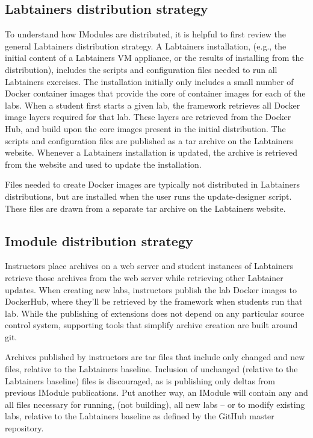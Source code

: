 \documentclass[12pt]{article}
\begin{document}
\subsection{Labtainers distribution strategy}
To understand how IModules are distributed, it is helpful to first review the general
Labtainers distribution strategy.  A Labtainers installation, (e.g., the initial content of a Labtainers VM 
appliance, or the results of installing from the distribution),  includes the scripts and configuration files 
needed to run all Labtainers exercises.  The installation initially only includes a small number of 
Docker container images that provide the core of container images for each of the labs.   
When a student first starts a given lab, the framework retrieves all Docker image layers 
required for that lab.  These layers are retrieved from the Docker Hub, and build upon the core images
present in the initial distribution.   The scripts and configuration files are 
published as a tar archive on the Labtainers website.  Whenever a Labtainers installation is updated, 
the archive is retrieved from the website and used to update the installation.

Files needed to create Docker images are typically not distributed in Labtainers distributions, but are 
installed when the user runs the update-designer script.  These files are drawn from a separate 
tar archive on the Labtainers website.  

\subsection{Imodule distribution strategy}
Instructors place archives on a web server and student
instances of Labtainers retrieve those archives from the web server while retrieving other
Labtainer updates.  When creating new labs, instructors publish the lab Docker images to
DockerHub, where they'll be retrieved by the framework when students run that lab.
While the publishing of extensions does not depend on any particular 
source control system, supporting tools that simplify archive creation are built around git.  

Archives published by instructors are tar files that include only changed and new files,
relative to the Labtainers baseline.  Inclusion of unchanged (relative to the 
Labtainers baseline) files is discouraged, as is publishing only deltas from previous
IModule publications.  Put another way, an IModule will contain any 
and all files
necessary for running, (not building), all new labs -- or to modify existing labs, 
relative to the Labtainers baseline as defined by the GitHub master repository.
\end{document}
